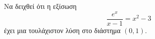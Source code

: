 Να δειχθεί ότι η εξίσωση
\[ \frac{e^x}{x-1}=x^2-3 \]
έχει μια τουλάχιστον λύση στο διάστημα $ (0,1) $.
